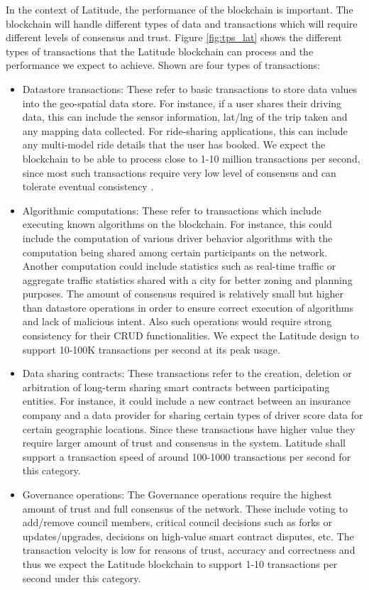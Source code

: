 In the context of Latitude, the performance of the blockchain is important. The blockchain will handle different types
of data and transactions which will require different levels of consensus and trust. Figure \ref{fig:tps_lat} shows the
different types of transactions that the Latitude blockchain can process and the performance we expect to achieve. Shown
are four types of transactions:
\begin{itemize}
    \item Datastore transactions: These refer to basic transactions to store data values into the geo-spatial data
        store. For instance, if a user shares their driving data, this can include the sensor information, lat/lng of
        the trip taken and any mapping data collected. For ride-sharing applications, this can include any multi-model
        ride details that the user has booked. We expect the blockchain to be able to process close to 1-10 million
        transactions per second, since most such transactions require very low level of consensus and can tolerate 
        eventual consistency \cite{eventual_con}.
    \item Algorithmic computations: These refer to transactions which include executing known algorithms on the
        blockchain. For instance, this could include the computation of various driver behavior algorithms with the
        computation being shared among certain participants on the network. Another computation could include statistics
        such as real-time traffic or aggregate traffic statistics shared with a city for better zoning and planning
        purposes. The amount of consensus required is relatively small but higher than datastore operations in order to
        ensure correct execution of algorithms and lack of malicious intent. Also such operations would require strong
        consistency for their CRUD functionalities. We expect the Latitude design to support 10-100K transactions per
        second at its peak usage.
    \item Data sharing contracts: These transactions refer to the creation, deletion or arbitration of long-term sharing
        smart contracts between participating entities. For instance, it could include a new contract between an
        insurance company and a data provider for sharing certain types of driver score data for certain geographic
        locations. Since these transactions have higher value they require larger amount of trust and consensus in the
        system. Latitude shall support a transaction speed of around 100-1000 transactions per second for this category.
    \item Governance operations: The Governance operations require the highest amount of trust and full consensus of the
        network. These include voting to add/remove council members, critical council decisions such as forks or
        updates/upgrades, decisions on high-value smart contract disputes, etc. The transaction velocity is low for
        reasons of trust, accuracy and correctness and thus we expect the Latitude blockchain to support 1-10
        transactions per second under this category.

\end{itemize}


